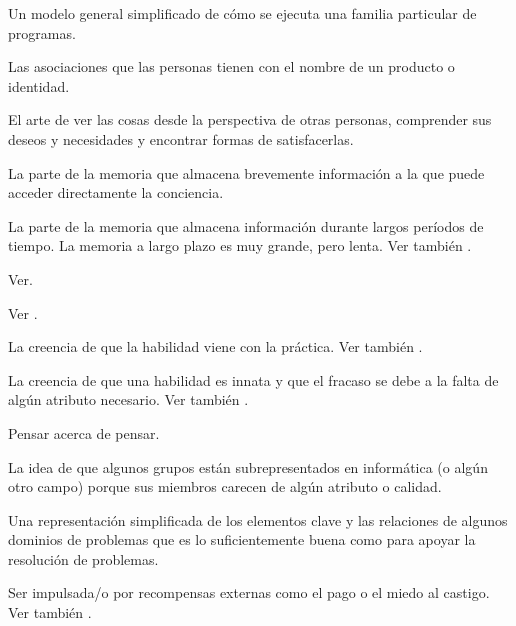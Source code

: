 \begin{description}
 Un modelo general simplificado de cómo se ejecuta una familia particular de programas.

 Las asociaciones que las personas tienen con el nombre de un producto o
identidad.

 El arte de ver las cosas desde la perspectiva
de otras personas, comprender sus deseos y necesidades y encontrar
formas de satisfacerlas.

 La parte de la memoria que almacena brevemente información a la que puede acceder directamente la conciencia.

 La parte de la memoria que
almacena información durante largos períodos de tiempo. La memoria a largo plazo es muy grande,
pero lenta. Ver también .

 Ver.

 Ver .

 La creencia de que la habilidad
viene con la práctica. Ver también .

 La creencia de que una habilidad es innata y que
el fracaso se debe a la falta de algún atributo necesario. Ver también
.

 Pensar acerca de pensar.

 La idea de que algunos grupos
están subrepresentados en informática (o algún otro campo) porque sus miembros
carecen de algún atributo o calidad.

 Una representación simplificada
de los elementos clave y las relaciones de algunos dominios de problemas que es
lo suficientemente buena como para apoyar la resolución de problemas.

 Ser impulsada/o por
recompensas externas como el pago o el miedo al castigo. Ver
también .


\end{description}
